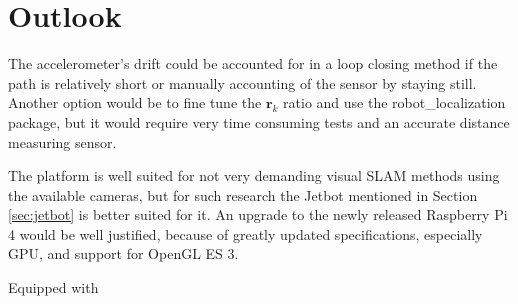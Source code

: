 \documentclass[class=article, crop=false]{standalone}
\begin{document}
\chapter{Outlook}\label{cha:outlook}

The accelerometer's drift could be accounted for in a loop closing method if the path is relatively short or manually accounting of the sensor by staying still. Another option would be to fine tune the $\textbf{r}_k$ ratio and use the robot\_localization package, but it would require very time consuming tests and an accurate distance measuring sensor.

The platform is well suited for not very demanding visual SLAM methods using the available cameras, but for such research the Jetbot mentioned in Section \ref{sec:jetbot} is better suited for it. An upgrade to the newly released Raspberry Pi 4 would be well justified, because of greatly updated specifications, especially GPU, and support for OpenGL ES 3\footnotemark.


Equipped with 
\end{document}
